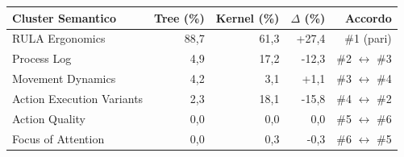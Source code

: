 \begin{tabular*}{\linewidth}{@{}l@{\extracolsep{\fill}}rrrr@{}}
\toprule
\textbf{Cluster Semantico} & \textbf{Tree (\%)} & \textbf{Kernel (\%)} & \textbf{$\Delta$ (\%)} & \textbf{Accordo} \\
\midrule
RULA Ergonomics & 88{,}7 & 61{,}3 & +27{,}4 & \#1 (pari) \\
Process Log & 4{,}9 & 17{,}2 & -12{,}3 & \#2 $\leftrightarrow$ \#3 \\
Movement Dynamics & 4{,}2 & 3{,}1 & +1{,}1 & \#3 $\leftrightarrow$ \#4 \\
Action Execution Variants & 2{,}3 & 18{,}1 & -15{,}8 & \#4 $\leftrightarrow$ \#2 \\
Action Quality & 0{,}0 & 0{,}0 & 0{,}0 & \#5 $\leftrightarrow$ \#6 \\
Focus of Attention & 0{,}0 & 0{,}3 & -0{,}3 & \#6 $\leftrightarrow$ \#5 \\
\bottomrule
\end{tabular*}

